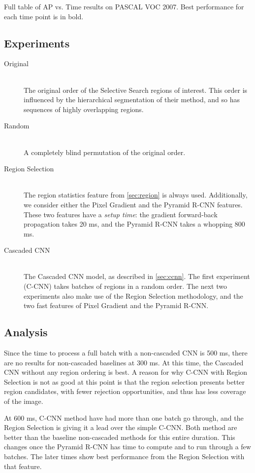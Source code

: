 \begin{table}[ht]
\centering
\caption{
Full table of AP vs. Time results on PASCAL VOC 2007.
Best performance for each time point is in bold.
}\label{tab:results}
\small{

}
\end{table}

\subsection{Experiments}
\begin{description}
  \item[Original] \hfill \\
  The original order of the Selective Search regions of interest.
  This order is influenced by the hierarchical segmentation of their method, and so has sequences of highly overlapping regions.
  \item[Random] \hfill \\
  A completely blind permutation of the original order.
  \item[Region Selection] \hfill \\
  The region statistics feature from \autoref{sec:region} is always used.
  Additionally, we consider either the Pixel Gradient and the Pyramid R-CNN features.
  These two features have a \emph{setup time}: the gradient forward-back propagation takes 20 ms, and the Pyramid R-CNN takes a whopping 800 ms.
  \item[Cascaded CNN] \hfill \\
  The Cascaded CNN model, as described in \autoref{sec:ccnn}.
  The first experiment (C-CNN) takes batches of regions in a random order.
  The next two experiments also make use of the Region Selection methodology, and the two fast features of Pixel Gradient and the Pyramid R-CNN.
\end{description}

\subsection{Analysis}
Since the time to process a full batch with a non-cascaded CNN is 500 ms, there are no results for non-cascaded baselines at 300 ms.
At this time, the Cascaded CNN without any region ordering is best.
A reason for why C-CNN with Region Selection is not as good at this point is that the region selection presents better region candidates, with fewer rejection opportunities, and thus has less coverage of the image.

At 600 ms, C-CNN method have had more than one batch go through, and the Region Selection is giving it a lead over the simple C-CNN.
Both method are better than the baseline non-cascaded methods for this entire duration.
This changes once the Pyramid R-CNN has time to compute and to run through a few batches.
The later times show best performance from the Region Selection with that feature.

